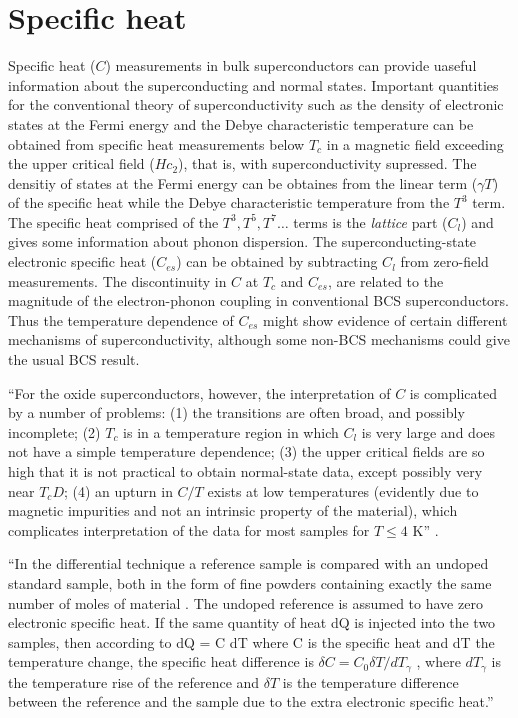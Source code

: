 \section{Specific heat}
\label{sec:specific_heat}

Specific heat ($C$) measurements in bulk superconductors can provide uaseful information about the superconducting and normal states.
Important quantities for the conventional theory of superconductivity such as the density of electronic states at the Fermi energy and the Debye characteristic temperature can be obtained from specific heat measurements below $T_c$ in a magnetic field exceeding the upper critical field ($Hc_2$), that is, with superconductivity supressed.
The densitiy of states at the Fermi energy can be obtaines from the linear term ($\gamma T$) of the specific heat while the Debye characteristic temperature from the $T^3$ term.
The specific heat comprised of the $T^3, T^5, T^7\ldots$ terms is the \textit{lattice} part ($C_l$) and gives some information about phonon dispersion. 
The superconducting-state electronic specific heat ($C_{es}$) can be obtained by subtracting $C_l$ from zero-field measurements.
The discontinuity in $C$ at $T_c$ and $C_{es}$, are related to the magnitude of the electron-phonon coupling in conventional BCS superconductors.
Thus the temperature dependence of $C_{es}$ might show evidence of certain different mechanisms of superconductivity, although some non-BCS mechanisms could give the usual BCS result.

``For the oxide superconductors, however, the interpretation of $C$ is complicated by a number of problems: (1) the transitions are often broad, and possibly incomplete; (2) $T_c$ is in a temperature region in which $C_l$ is very large and does not have a simple temperature dependence; (3) the upper critical fields are so high that it is not practical to obtain normal-state data, except possibly very near $T_cD$; (4) an upturn in $C/T$ exists at low temperatures (evidently due to magnetic impurities and not an intrinsic property of the material), which complicates interpretation of the data for most samples for $T \leq 4$ K'' \cite{Fisher1988}.


``In the differential technique a reference sample is compared with an undoped standard sample, both in the form of fine powders containing exactly the same number of moles of material \cite{Loram1993}. The undoped reference is assumed to have zero electronic specific heat. If the same quantity of heat dQ is injected into the two samples, then according to dQ = C dT where C is the specific heat and dT the temperature change, the specific heat difference is $\delta C = C_0 \delta T/dT_\gamma$ , where $dT_\gamma$ is the temperature rise of the reference and $\delta T$ is the temperature difference between the reference and the sample due to the extra electronic specific heat.'' \cite{Timusk1999}

